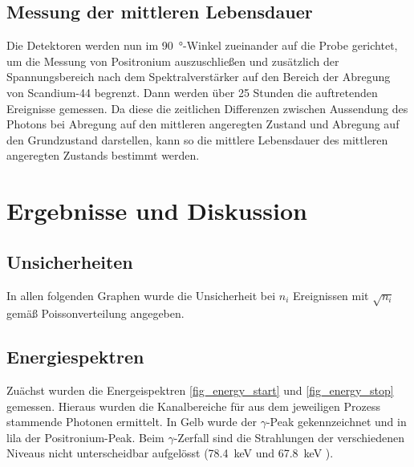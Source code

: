 \documentclass[
	a4paper,
	12pt,
	pagesize,
	ngerman
]{scrartcl}
\begin{document}
	\subsection{Messung der mittleren Lebensdauer}

	Die Detektoren werden nun im \SI{90}{\degree}-Winkel zueinander auf die Probe gerichtet, um die Messung von Positronium auszuschließen und zusätzlich der Spannungsbereich nach dem Spektralverstärker auf den Bereich der Abregung von Scandium-44 begrenzt. %
	Dann werden über \num{25} Stunden die auftretenden Ereignisse gemessen.
	Da diese die zeitlichen Differenzen zwischen Aussendung des Photons bei Abregung auf den mittleren angeregten Zustand und Abregung auf den Grundzustand darstellen, kann so die mittlere Lebensdauer des mittleren angeregten Zustands bestimmt werden.


	\section{Ergebnisse und Diskussion}


	\subsection{Unsicherheiten}
	In allen folgenden Graphen wurde die Unsicherheit bei $n_i$ Ereignissen mit $\sqrt{n_i}$ gemäß Poissonverteilung angegeben.

	\subsection{Energiespektren}
	Zuächst wurden die Energeispektren \cref{fig_energy_start} und \cref{fig_energy_stop} gemessen. Hieraus wurden die Kanalbereiche für aus dem jeweiligen Prozess stammende Photonen ermittelt.
	In Gelb wurde der $\gamma$-Peak gekennzeichnet und in lila der Positronium-Peak.
	Beim $\gamma$-Zerfall sind die Strahlungen der verschiedenen Niveaus nicht unterscheidbar aufgelösst (\SI{78.4}{keV} und \SI{67.8}{keV} \cite{Anleitung}). %
\end{document}
